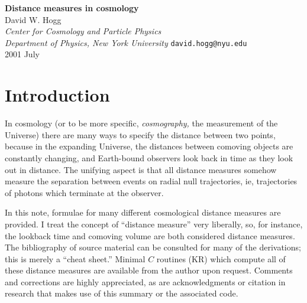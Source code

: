 

\newcommand{\simg}{\raisebox{-0.7ex}{\mbox{$\stackrel{\textstyle >}{\sim}$}}}
\newcommand{\siml}{\raisebox{-0.7ex}{\mbox{$\stackrel{\textstyle <}{\sim}$}}}
\newcommand{\bm}[1]{\mbox{\boldmath $#1$}}
\newenvironment{references}
	{\section{References}\begin{list}{}{
		\topsep=0in
		\partopsep=0in
		\itemsep=0in
		\parsep=0in
		\rightmargin=0in
		\leftmargin=3ex
		\itemindent=-1.0\leftmargin
		\labelsep=0in
		\labelwidth=0in}}
	{\end{list}}



\begin{center}
{\LARGE\bf Distance measures in cosmology} \\[1.0\baselineskip]
{\large\sc David W. Hogg} \\[0.5\baselineskip]
{\normalsize\sl Center for Cosmology and Particle Physics \\
                Department of Physics, New York University}
{\normalsize\tt david.hogg@nyu.edu} \\[0.5\baselineskip]
{2001 July}
\end{center}

\section{Introduction}

In cosmology (or to be more specific, {\em cosmography,\/} the
measurement of the Universe) there are many ways to specify the
distance between two points, because in the expanding Universe, the
distances between comoving objects are constantly changing, and
Earth-bound observers look back in time as they look out in distance.
The unifying aspect is that all distance measures somehow measure the
separation between events on radial null trajectories, ie,
trajectories of photons which terminate at the observer.

In this note, formulae for many different cosmological distance
measures are provided.  I treat the concept of ``distance measure''
very liberally, so, for instance, the lookback time and comoving
volume are both considered distance measures.  The bibliography of
source material can be consulted for many of the derivations; this is
merely a ``cheat sheet.''  Minimal $C$ routines (KR) which compute all
of these distance measures are available from the author upon request.
Comments and corrections are highly appreciated, as are
acknowledgments or citation in research that makes use of this summary
or the associated code.


